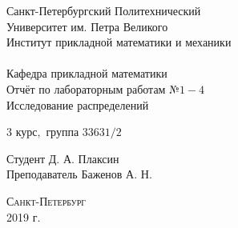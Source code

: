 \documentclass[a4]{article}
\begin{document}
\def\contentsname{\LARGE{Содержание}}
\thispagestyle{empty}
\begin{center} 
\vspace{2cm} 
{\Large \sc Санкт-Петербургский Политехнический}\\
\vspace{2mm}
{\Large \sc Университет} им. {\Large\sc Петра Великого}\\
\vspace{1cm}
{\large \sc Институт прикладной математики и механики\\ 
\vspace{0.5mm}
\textsc{}}\\ 
\vspace{0.5mm}
{\large\sc Кафедра прикладной математики}\\
\vspace{15mm}
{\huge \sc Отчёт по лабораторным работам №$1-4$\\
\vspace{4mm}
Исследование распределений
\vspace{6mm}
 }
\vspace*{2mm}
\vspace{1cm}

{\sc $3$ курс$,$ группа $33631/2$}

\vspace{2cm} 
Студент \hfill Д. А. Плаксин\\
\vspace{1cm}
Преподаватель \hfill Баженов А. Н.\\
\vspace{20mm} 

\end{center} 
\begin{center}
\vfill {\large\textsc{Санкт-Петербург}}\\ 
2019 г.
\end{center}

\end{document}
